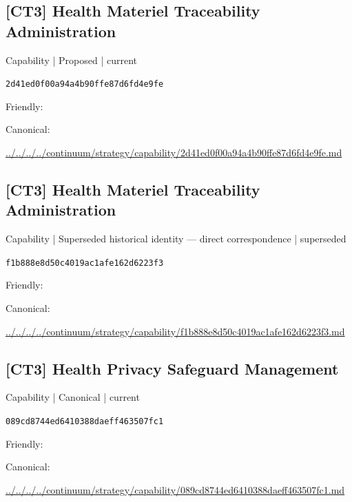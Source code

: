 \documentclass[10pt,a4paper]{article}
\begin{document}
\subsection*{[CT3] Health Materiel Traceability Administration}
{\small Capability | Proposed | current}\par
\texttt{2d41ed0f00a94a4b90ffe87d6fd4e9fe}\par
Friendly: \par
Canonical: \par
{\footnotesize\url{../../../../continuum/strategy/capability/2d41ed0f00a94a4b90ffe87d6fd4e9fe.md}}\par
\subsection*{[CT3] Health Materiel Traceability Administration}
{\small Capability | Superseded historical identity — direct correspondence | superseded}\par
\texttt{f1b888e8d50c4019ac1afe162d6223f3}\par
Friendly: \par
Canonical: \par
{\footnotesize\url{../../../../continuum/strategy/capability/f1b888e8d50c4019ac1afe162d6223f3.md}}\par
\subsection*{[CT3] Health Privacy Safeguard Management}
{\small Capability | Canonical | current}\par
\texttt{089cd8744ed6410388daeff463507fc1}\par
Friendly: \par
Canonical: \par
{\footnotesize\url{../../../../continuum/strategy/capability/089cd8744ed6410388daeff463507fc1.md}}\par
\end{document}
